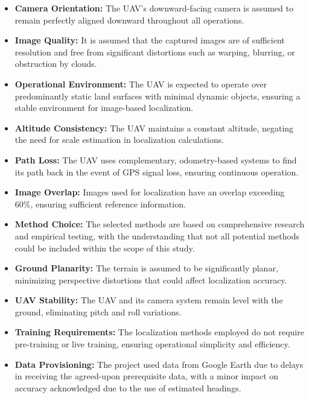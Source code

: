 \begin{itemize}
    \item \textbf{Camera Orientation:} The UAV's downward-facing camera is assumed to remain perfectly aligned downward throughout all operations.
    
    \item \textbf{Image Quality:} It is assumed that the captured images are of sufficient resolution and free from significant distortions such as warping, blurring, or obstruction by clouds.
    
    \item \textbf{Operational Environment:} The UAV is expected to operate over predominantly static land surfaces with minimal dynamic objects, ensuring a stable environment for image-based localization.
    
    \item \textbf{Altitude Consistency:} The UAV maintains a constant altitude, negating the need for scale estimation in localization calculations.
    
    \item \textbf{Path Loss:} The UAV uses complementary, odometry-based systems to find its path back in the event of GPS signal loss, ensuring continuous operation.
    
    \item \textbf{Image Overlap:} Images used for localization have an overlap exceeding 60\%, ensuring sufficient reference information.
    
    \item \textbf{Method Choice:} The selected methods are based on comprehensive research and empirical testing, with the understanding that not all potential methods could be included within the scope of this study.
    
    \item \textbf{Ground Planarity:} The terrain is assumed to be significantly planar, minimizing perspective distortions that could affect localization accuracy.
    
    \item \textbf{UAV Stability:} The UAV and its camera system remain level with the ground, eliminating pitch and roll variations.
    
    \item \textbf{Training Requirements:} The localization methods employed do not require pre-training or live training, ensuring operational simplicity and efficiency.
    
    \item \textbf{Data Provisioning:} The project used data from Google Earth due to delays in receiving the agreed-upon prerequisite data, with a minor impact on accuracy acknowledged due to the use of estimated headings.
    

\end{itemize}
